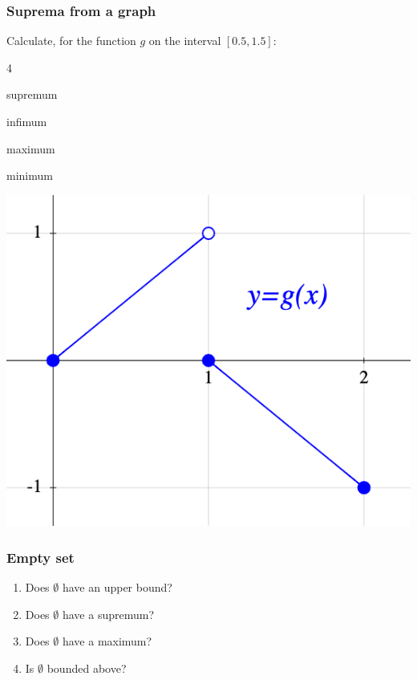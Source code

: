 \documentclass[14pt]{beamer}
\newcommand{\setsize}[1]{\fontsize{#1}{#1}\selectfont} %
\newcommand{\smallerfont}{\setsize{13}} %
\begin{document}
	\begin{frame}[t]
		\smallerfont
		\frametitle{Suprema from a graph}

		Calculate, for the function $g$ on the interval $[0.5, 1.5]$:
		\begin{enumerate}
		\end{enumerate}

		\begin{center}
			\includegraphics[scale=.35]{G20}
		\end{center}
	\end{frame}
	\begin{frame}[t]
		\frametitle{Empty set}

		\begin{enumerate}
			\item Does $\emptyset$ have an upper bound?

			\item Does $\emptyset$ have a supremum?

			\item Does $\emptyset$ have a maximum?

			\item Is $\emptyset$ bounded above?
		\end{enumerate}
	\end{frame}
\end{document}

